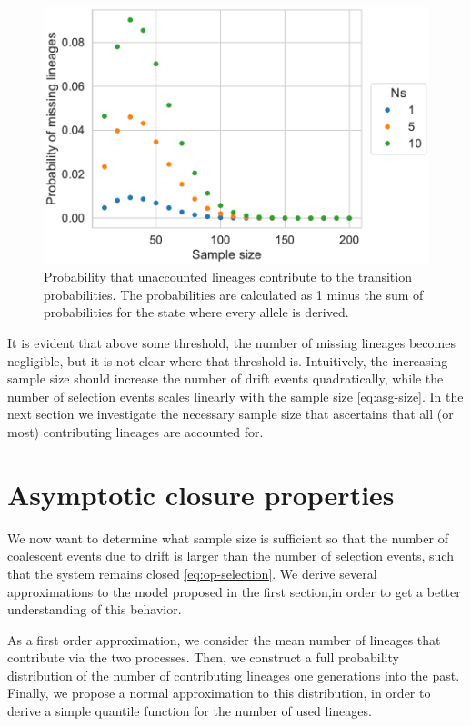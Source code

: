 \documentclass[review]{elsarticle}
\begin{document}
\begin{figure}
  \centering
  \includegraphics[]{fig/missing.pdf}
  \caption{Probability that unaccounted lineages contribute to the transition probabilities. The
    probabilities are calculated as 1 minus the sum of probabilities for the state where every
    allele is derived.}
    \label{fig:missing}
\end{figure}

It is evident that above some threshold, the number of missing lineages becomes negligible, but it
is not clear where that threshold is. Intuitively, the increasing sample size should increase the
number of drift events quadratically, while the number of selection events scales linearly with the
sample size \eqref{eq:asg-size}. In the next section we investigate the necessary sample size that
ascertains that all (or most) contributing lineages are accounted for.

\section{Asymptotic closure properties}

We now want to determine what sample size is sufficient so that the number of coalescent events due
to drift is larger than the number of selection events, such that the system remains closed
\eqref{eq:op-selection}. We derive several approximations to the model proposed in the first
section,in order to get a better understanding of this behavior.

As a first order approximation, we consider the mean number of lineages that contribute via the two
processes. Then, we construct a full probability distribution of the number of contributing lineages
one generations into the past. Finally, we propose a normal approximation to this distribution, in
order to derive a simple quantile function for the number of used lineages.
\end{document}
